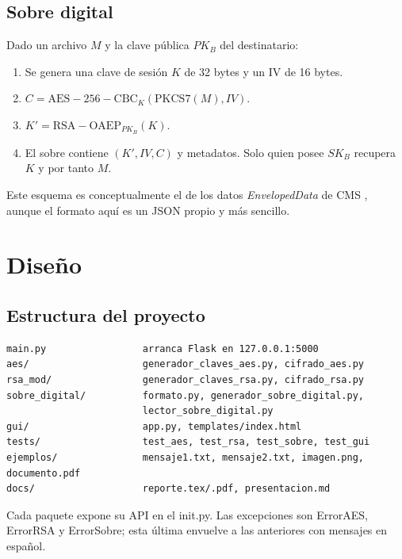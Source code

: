 \documentclass[11pt,a4paper]{article}
\newcommand{\cod}[1]{{\ttfamily\let\_\relax\def\_{\textunderscore\penalty0\hskip0pt\relax}\def\/{\slash\penalty0\hskip0pt\relax}#1}}
\begin{document}
\subsection{Sobre digital}
Dado un archivo $M$ y la clave pública $PK_B$ del destinatario:
\begin{enumerate}
  \item Se genera una clave de sesión $K$ de 32 bytes y un IV de 16 bytes.
  \item $C = \mathrm{AES{-}256{-}CBC}_K(\mathrm{PKCS7}(M), IV)$.
  \item $K' = \mathrm{RSA{-}OAEP}_{PK_B}(K)$.
  \item El sobre contiene $(K', IV, C)$ y metadatos. Solo quien posee $SK_B$ recupera $K$ y por tanto $M$.
\end{enumerate}
Este esquema es conceptualmente el de los datos \emph{EnvelopedData} de CMS \cite{rfc5652}, aunque el formato
aquí es un JSON propio y más sencillo.

\section{Diseño}
\subsection{Estructura del proyecto}
\begin{lstlisting}[language={},basicstyle=\ttfamily\footnotesize]
main.py                 arranca Flask en 127.0.0.1:5000
aes/                    generador_claves_aes.py, cifrado_aes.py
rsa_mod/                generador_claves_rsa.py, cifrado_rsa.py
sobre_digital/          formato.py, generador_sobre_digital.py,
                        lector_sobre_digital.py
gui/                    app.py, templates/index.html
tests/                  test_aes, test_rsa, test_sobre, test_gui
ejemplos/               mensaje1.txt, mensaje2.txt, imagen.png, documento.pdf
docs/                   reporte.tex/.pdf, presentacion.md
\end{lstlisting}
Cada paquete expone su API en el \cod{\_\_init\_\_.py}. Las excepciones son \cod{ErrorAES},
\cod{ErrorRSA} y \cod{ErrorSobre}; esta última envuelve a las anteriores con mensajes en español.
\end{document}
